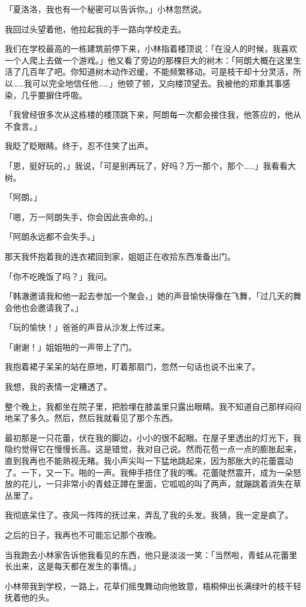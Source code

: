 \documentclass[UTF8]{ctexart}
\begin{document}
「夏洛洛，我也有一个秘密可以告诉你。」小林忽然说。

我回过头望着他，他拉起我的手一路向学校走去。

我们在学校最高的一栋建筑前停下来，小林指着楼顶说：「在没人的时候，我喜欢一个人爬上去做一个游戏。」他又看了旁边的那棵巨大的树木：「阿朗大概在这里生活了几百年了吧。你知道树木动作迟缓，不能频繁移动。可是枝干却十分灵活，所以……我可以完全地信任他……」他顿了顿，又向楼顶望去。我被他的郑重其事感染，几乎要摒住呼吸。

「我曾经很多次从这栋楼的楼顶跳下来，阿朗每一次都会接住我，他答应的，他从不食言。」

我眨了眨眼睛。终于，忍不住笑了出声。

「恩，挺好玩的，」我说，「可是别再玩了，好吗？万一那个，那个……」我看看大树。

「阿朗。」

「嗯，万一阿朗失手，你会因此丧命的。」

「阿朗永远都不会失手。」

 那天我怀抱着我的连衣裙回到家，姐姐正在收拾东西准备出门。

「你不吃晚饭了吗？」我问。

「韩澈邀请我和他一起去参加一个聚会，」她的声音愉快得像在飞舞，「过几天的舞会他也会邀请我了。」

「玩的愉快！」爸爸的声音从沙发上传过来。

「谢谢！」姐姐啪的一声带上了门。

我抱着裙子呆呆的站在原地，盯着那扇门，忽然一句话也说不出来了。

我想，我的表情一定糟透了。

整个晚上，我都坐在院子里，把脸埋在膝盖里只露出眼睛。我不知道自己那样闷闷地呆了多久。然后，然后我就看见了那个东西。

最初那是一只花蕾，伏在我的脚边，小小的很不起眼。在屋子里透出的灯光下，我隐约觉得它在慢慢长高。这是错觉，我对自己说。然而花苞一点一点的膨胀起来，直到我再也不能熟视无睹。我小声尖叫一下猛地跳起来，因为那胀大的花蕾震动了。一下，又一下。啪的一声。我伸手捂住了我的嘴。花蕾陡然震开，成为一朵怒放的花儿，一只非常小的青蛙正蹲在里面，它呱呱的叫了两声，就蹦跳着消失在草丛里了。

我彻底呆住了。夜风一阵阵的抚过来，弄乱了我的头发。我猜，我一定是疯了。

之后的日子，我再也不可能忘记那个夜晚。

当我跑去小林家告诉他我看见的东西，他只是淡淡一笑：「当然啦，青蛙从花蕾里长出来，这是每天都在发生的事情。」

小林带我到学校，一路上，花草们摇曳舞动向他致意，梧桐伸出长满绿叶的枝干轻抚着他的头。
\end{document}
